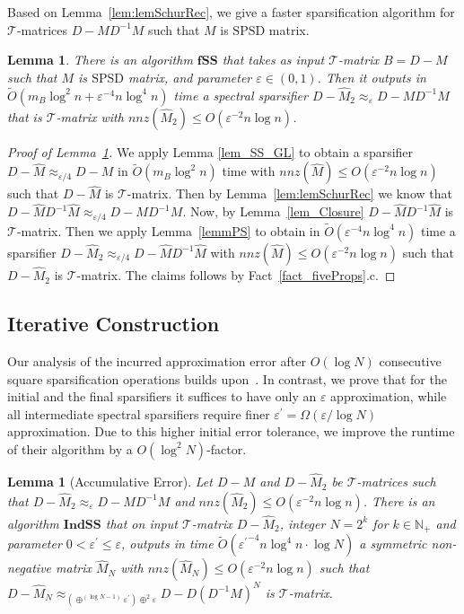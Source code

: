 \documentclass[11pt]{article}
\newcommand{\SPSD}{\mathrm{SPSD}}
\newcommand{\GL}{\mathcal{T}}
\newcommand{\fSS}{\mathrm{\mathbf{fSS}}}
\newcommand{\IndSS}{\mathrm{\mathbf{IndSS}}}
\newcommand{\wO}{\widetilde{O}}
\newcommand{\hM}{\widehat{M}}
\newcommand{\Di}{D^{-1}}
\newcommand{\prm}{\prime}
\newcommand{\N}{\mathbb{N}}
\newcommand{\eps}{\epsilon}
\renewcommand{\leq}{\leqslant}
\newcommand{\lemref}[1]{Lemma~\ref{lem:#1}}
\renewcommand{\eps}{\varepsilon}
\newtheorem{lem}[thm]{Lemma}
\numberwithin{thm}{section}
\begin{document}
Based on \lemref{lemSchurRec}, we give a faster sparsification algorithm for $\GL$-matrices $D-M\Di M$ such that $M$ is $\SPSD$ matrix.

\begin{lem}\label{lem_my_GL}
There is an algorithm $\fSS$
that takes as input $\GL$-matrix $B=D-M$ such that
$M$ is $\SPSD$ matrix, and parameter $\eps\in(0,1)$.
Then it outputs in $\wO(m_{B}\log^{2}n+\eps^{-4}n\log^{4}n)$
time a spectral sparsifier $D-\hM_{2}\approx_{\eps}D-M\Di M$
that is $\GL$-matrix with $nnz(\hM_{2})\leq O(\eps^{-2}n\log n)$.
\end{lem}

\begin{proof}[Proof of Lemma~\ref{lem_my_GL}] We apply Lemma \ref{lem_SS_GL} to obtain
a sparsifier $D-\hM \approx_{\eps/4}D-M$ in $\wO(m_{B}\log^{2}n)$
time with $nnz(\hM )\leq O(\eps^{-2}n\log n)$
such that $D-\hM $ is $\GL$-matrix. Then by \lemref{lemSchurRec} we know that $D-\hM \Di \hM \approx_{\eps/4}D-M\Di M$.
Now, by Lemma~\ref{lem_Closure} $D-\hM \Di \hM $
is $\GL$-matrix. Then we apply Lemma~\ref{lemmPS}
to obtain in $\wO(\eps^{-4}n\log^{4}n)$
time a sparsifier $D-\hM_{2}\approx_{\eps/4}D-\hM \Di \hM $
with $nnz(\hM )\leq O(\eps^{-2}n\log n)$
such that $D-\hM_{2}$ is $\GL$-matrix. The claims follows by Fact~\ref{fact_fiveProps}.c.
\end{proof}

\subsection{Iterative Construction}\label{subsec:IterConst}

Our analysis of the incurred approximation error after $O(\log N)$ consecutive square sparsification operations builds upon~\cite[Lemma 4.1]{arxivCCLPT15}. In contrast, we prove that for the initial and the final sparsifiers it suffices to have only an $\eps$ approximation, while all intermediate spectral sparsifiers require finer $\eps^{\prm}=\Omega(\eps/\log N)$ approximation. Due to this higher initial error tolerance, we improve the runtime of their algorithm by a $O(\log^{2}N)$-factor.

\begin{lem}[Accumulative Error]\label{lem_IndSS}
Let $D-M$ and $D-\hM_2$ be $\GL$-matrices such that $D-\hM_2\approx_{\eps}D-M\Di M$ and $nnz(\hM_2)\leq O(\eps^{-2}n\log n)$. There is an algorithm $\IndSS$ that on input $\GL$-matrix $D-\hM_2$, integer $N=2^k$ for $k\in\N_+$ and parameter $0<\eps^{\prm}\leq\eps$, outputs in time $\wO({\eps^{\prm}}^{-4}n\log^{4}n\cdot\log N)$ a symmetric non-negative matrix $\hM_{N}$ with
$nnz(\hM_N)\leq O(\eps^{-2}n\log n)$
such that $D-\hM_N\approx_{(\oplus^{(\log N - 1)}\eps^{\prm})\oplus^{2}\eps}D-D(\Di M)^N$ is $\GL$-matrix.
\end{lem}
\end{document}

